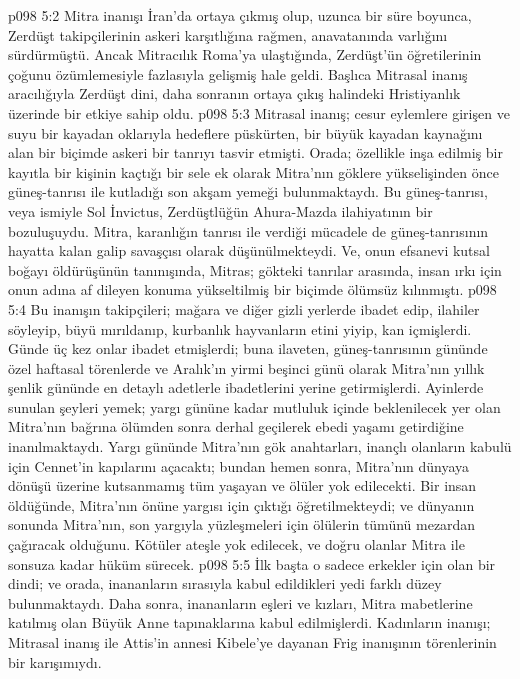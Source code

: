 \vs p098 5:2 Mitra inanışı İran’da ortaya çıkmış olup, uzunca bir süre boyunca, Zerdüşt takipçilerinin askeri karşıtlığına rağmen, anavatanında varlığını sürdürmüştü. Ancak Mitracılık Roma’ya ulaştığında, Zerdüşt’ün öğretilerinin çoğunu özümlemesiyle fazlasıyla gelişmiş hale geldi. Başlıca Mitrasal inanış aracılığıyla Zerdüşt dini, daha sonranın ortaya çıkış halindeki Hristiyanlık üzerinde bir etkiye sahip oldu.
\vs p098 5:3 Mitrasal inanış; cesur eylemlere girişen ve suyu bir kayadan oklarıyla hedeflere püskürten, bir büyük kayadan kaynağını alan bir biçimde askeri bir tanrıyı tasvir etmişti. Orada; özellikle inşa edilmiş bir kayıtla bir kişinin kaçtığı bir sele ek olarak Mitra’nın göklere yükselişinden önce güneş\hyp{}tanrısı ile kutladığı son akşam yemeği bulunmaktaydı. Bu güneş\hyp{}tanrısı, veya ismiyle Sol İnvictus, Zerdüştlüğün Ahura\hyp{}Mazda ilahiyatının bir bozuluşuydu. Mitra, karanlığın tanrısı ile verdiği mücadele de güneş\hyp{}tanrısının hayatta kalan galip savaşçısı olarak düşünülmekteydi. Ve, onun efsanevi kutsal boğayı öldürüşünün tanınışında, Mitras; gökteki tanrılar arasında, insan ırkı için onun adına af dileyen konuma yükseltilmiş bir biçimde ölümsüz kılınmıştı.
\vs p098 5:4 Bu inanışın takipçileri; mağara ve diğer gizli yerlerde ibadet edip, ilahiler söyleyip, büyü mırıldanıp, kurbanlık hayvanların etini yiyip, kan içmişlerdi. Günde üç kez onlar ibadet etmişlerdi; buna ilaveten, güneş\hyp{}tanrısının gününde özel haftasal törenlerde ve Aralık’ın yirmi beşinci günü olarak Mitra’nın yıllık şenlik gününde en detaylı adetlerle ibadetlerini yerine getirmişlerdi. Ayinlerde sunulan şeyleri yemek; yargı gününe kadar mutluluk içinde beklenilecek yer olan Mitra’nın bağrına ölümden sonra derhal geçilerek ebedi yaşamı getirdiğine inanılmaktaydı. Yargı gününde Mitra’nın gök anahtarları, inançlı olanların kabulü için Cennet’in kapılarını açacaktı; bundan hemen sonra, Mitra’nın dünyaya dönüşü üzerine kutsanmamış tüm yaşayan ve ölüler yok edilecekti. Bir insan öldüğünde, Mitra’nın önüne yargısı için çıktığı öğretilmekteydi; ve dünyanın sonunda Mitra’nın, son yargıyla yüzleşmeleri için ölülerin tümünü mezardan çağıracak olduğunu. Kötüler ateşle yok edilecek, ve doğru olanlar Mitra ile sonsuza kadar hüküm sürecek.
\vs p098 5:5 İlk başta o sadece erkekler için olan bir dindi; ve orada, inananların sırasıyla kabul edildikleri yedi farklı düzey bulunmaktaydı. Daha sonra, inananların eşleri ve kızları, Mitra mabetlerine katılmış olan Büyük Anne tapınaklarına kabul edilmişlerdi. Kadınların inanışı; Mitrasal inanış ile Attis’in annesi Kibele’ye dayanan Frig inanışının törenlerinin bir karışımıydı.
